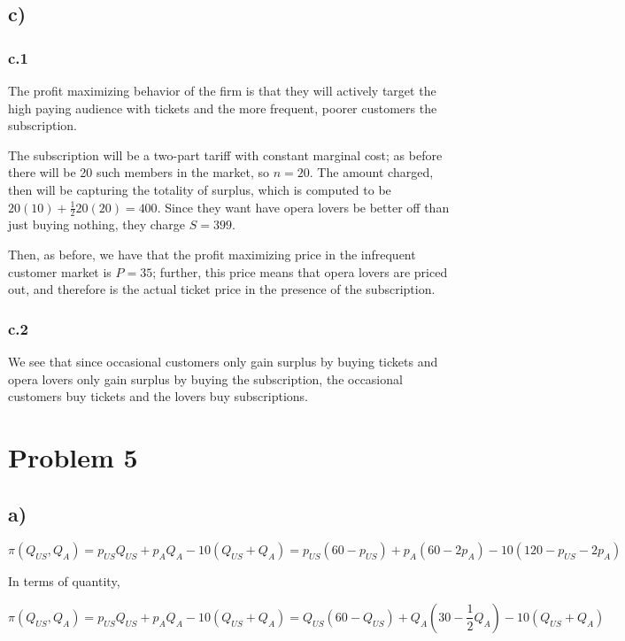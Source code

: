 \documentclass[12pt,letterpaper]{article}
\theoremstyle{definition}
\begin{document}
\subsection*{c)}
\subsubsection*{c.1}

The profit maximizing behavior of the firm is that they will actively target the
high paying audience with tickets and the more frequent, poorer customers the
subscription.

The subscription will be a two-part tariff with constant marginal cost; as
before there will be 20 such members in the market, so $n = 20$. The amount
charged, then will be capturing the totality of surplus, which is computed to be
$20(10) + \frac{1}{2} 20(20) = 400$. Since they want have opera lovers be better
off than just buying nothing, they charge $S = 399$.

Then, as before, we have that the profit maximizing price in the infrequent
customer market is $P = 35$; further, this price means that opera lovers are
priced out, and therefore is the actual ticket price in the presence of the subscription.

\subsubsection*{c.2}

We see that since occasional customers only gain surplus by buying tickets and
opera lovers only gain surplus by buying the subscription, the occasional
customers buy tickets and the lovers buy subscriptions.

\section*{Problem 5}

\subsection*{a)}

\[
  \pi(Q_{US},Q_A) = p_{US}Q_{US} + p_AQ_A - 10(Q_{US} + Q_A) = p_{US}(60-p_{US})
  + p_A(60-2p_A) - 10(120 - p_{US} - 2p_A)
\]

In terms of quantity,

\[
  \pi(Q_{US},Q_A) = p_{US}Q_{US} + p_AQ_A - 10(Q_{US} + Q_A) = Q_{US}(60-Q_{US})
  + Q_A(30-\frac{1}{2}Q_A) - 10(Q_{US} + Q_A)
\]
\end{document}
